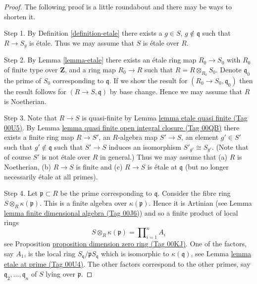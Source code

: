 \documentclass{amsart}
\theoremstyle{plain}
\theoremstyle{definition}
\theoremstyle{remark}
\numberwithin{equation}{subsection}
\begin{document}
\begin{proof}
The following proof is a little roundabout and there may be ways to
shorten it.

\medskip\noindent
Step 1. By Definition \ref{definition-etale}
there exists a $g \in S$, $g \not \in \mathfrak q$
such that $R \to S_g$ is \'etale. Thus we may assume that $S$ is \'etale
over $R$.

\medskip\noindent
Step 2. By Lemma \ref{lemma-etale} there exists an \'etale ring map
$R_0 \to S_0$ with $R_0$ of finite type over $\mathbf{Z}$, and a ring map
$R_0 \to R$ such that $R = R \otimes_{R_0} S_0$. Denote
$\mathfrak q_0$ the prime of $S_0$ corresponding to $\mathfrak q$.
If we show the result for $(R_0 \to S_0, \mathfrak q_0)$ then the
result follows for $(R \to S, \mathfrak q)$ by base change. Hence
we may assume that $R$ is Noetherian.

\medskip\noindent
Step 3.
Note that $R \to S$ is quasi-finite by Lemma \href{https://stacks.math.columbia.edu/tag/00U5}{lemma etale quasi finite (Tag 00U5)}.
By Lemma \href{https://stacks.math.columbia.edu/tag/00QB}{lemma quasi finite open integral closure (Tag 00QB)}
there exists a finite ring map $R \to S'$, an $R$-algebra map
$S' \to S$, an element $g' \in S'$ such that
$g' \not \in \mathfrak q$ such that $S' \to S$ induces
an isomorphism $S'_{g'} \cong S_{g'}$.
(Note that of course $S'$ is not \'etale over $R$ in general.)
Thus we may assume that (a) $R$ is Noetherian, (b) $R \to S$ is finite
and (c) $R \to S$ is \'etale at $\mathfrak q$
(but no longer necessarily \'etale at all primes).

\medskip\noindent
Step 4. Let $\mathfrak p \subset R$ be the prime corresponding
to $\mathfrak q$. Consider the fibre ring
$S \otimes_R \kappa(\mathfrak p)$. This is a finite algebra over
$\kappa(\mathfrak p)$. Hence it is Artinian
(see Lemma \href{https://stacks.math.columbia.edu/tag/00J6}{lemma finite dimensional algebra (Tag 00J6)}) and
so a finite product of local rings
$$
S \otimes_R \kappa(\mathfrak p) = \prod\nolimits_{i = 1}^n A_i
$$
see Proposition \href{https://stacks.math.columbia.edu/tag/00KJ}{proposition dimension zero ring (Tag 00KJ)}. One of the factors,
say $A_1$, is the local ring $S_{\mathfrak q}/\mathfrak pS_{\mathfrak q}$
which is isomorphic to $\kappa(\mathfrak q)$,
see Lemma \href{https://stacks.math.columbia.edu/tag/00U4}{lemma etale at prime (Tag 00U4)}. The other factors correspond to
the other primes, say $\mathfrak q_2, \ldots, \mathfrak q_n$ of
$S$ lying over $\mathfrak p$.


\end{proof}
\end{document}
